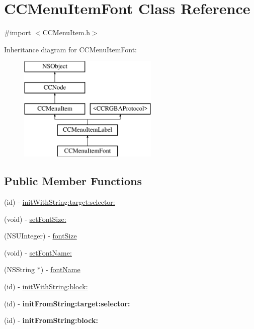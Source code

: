 \hypertarget{class_c_c_menu_item_font}{\section{C\-C\-Menu\-Item\-Font Class Reference}
\label{class_c_c_menu_item_font}
}


{\ttfamily \#import $<$C\-C\-Menu\-Item.\-h$>$}

Inheritance diagram for C\-C\-Menu\-Item\-Font\-:\begin{figure}[H]
\begin{center}
\leavevmode
\includegraphics[height=5.000000cm]{class_c_c_menu_item_font}
\end{center}
\end{figure}
\subsection*{Public Member Functions}
\begin{DoxyCompactItemize}
\item 
(id) -\/ \hyperlink{class_c_c_menu_item_font_a73f390b7e026dfa15dbdf303f3b6a096}{init\-With\-String\-:target\-:selector\-:}
\item 
(void) -\/ \hyperlink{class_c_c_menu_item_font_a9d5655a6fd45cc758727b1eb057b0b4a}{set\-Font\-Size\-:}
\item 
(N\-S\-U\-Integer) -\/ \hyperlink{class_c_c_menu_item_font_ac0dc8a7cdb7f19d6ea3b7b881d566483}{font\-Size}
\item 
(void) -\/ \hyperlink{class_c_c_menu_item_font_a5b75dfc3067178f9bcc1a87621c10be0}{set\-Font\-Name\-:}
\item 
(N\-S\-String $\ast$) -\/ \hyperlink{class_c_c_menu_item_font_a3172479896775418ff0b201ead4b4ccf}{font\-Name}
\item 
(id) -\/ \hyperlink{class_c_c_menu_item_font_a12bd140226884e90d58912b3df397300}{init\-With\-String\-:block\-:}
\item 
\hypertarget{class_c_c_menu_item_font_acb1f1e0feb0433e5ed6f6c6788b3211d}{(id) -\/ {\bfseries init\-From\-String\-:target\-:selector\-:}}\label{class_c_c_menu_item_font_acb1f1e0feb0433e5ed6f6c6788b3211d}

\item 
\hypertarget{class_c_c_menu_item_font_a7b249f17221b826c9c90d72e284eb604}{(id) -\/ {\bfseries init\-From\-String\-:block\-:}}\label{class_c_c_menu_item_font_a7b249f17221b826c9c90d72e284eb604}

\end{DoxyCompactItemize}
